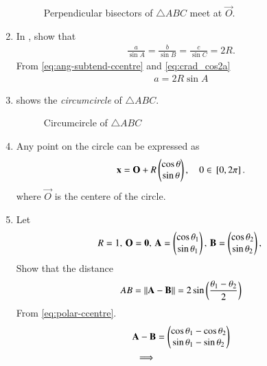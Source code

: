 \begin{enumerate}[label=\thesubsection.\arabic*.,ref=\thesubsection.\theenumi]
\begin{figure}[!ht]
\begin{center}
		\resizebox{0.6\columnwidth}{!}{}
	\end{center}
	\caption{ Perpendicular bisectors of $\triangle ABC$ meet at $\vec{O}$.}
	\label{fig:tri_ccentre}	
\end{figure}
\item In
	,
show that 
\begin{align}
\label{eq:tri_crad_R}
\frac{a}{\sin A} = \frac{b}{\sin B} = \frac{c}{\sin C} = 2R.
\end{align}
%
%
\solution
From 
\eqref{eq:ang-subtend-ccentre}
and 
\eqref{eq:crad_cos2a}
  \begin{align}
	  a = 2R \sin A
  \end{align}
  \item 
  shows the {\em circumcircle} of $\triangle ABC$.
\begin{figure}[!ht]
	\begin{center}
		\resizebox{0.6\columnwidth}{!}{}
	\end{center}
	\caption{Circumcircle of $\triangle ABC$}
	\label{fig:tri_ccircle-ang}	
\end{figure}
\item Any point on the circle can be expressed as 
  \begin{align}
	  \mathbf{x} = \mathbf{O} + R\begin{pmatrix}\cos \theta \\ \sin \theta\end{pmatrix}, \quad 0 \in {}\left[0, 2\pi\right]
\label{eq:polar-ccentre}.
  \end{align}
  where $\vec{O}$ is the centere of the circle.
  \item Let
  \begin{align}
	  R = 1,\,
	  \mathbf{O} = \mathbf{0} ,\,
	  \mathbf{A} = \begin{pmatrix}\cos \theta_1 \\ \sin \theta_1\end{pmatrix},\,
	  \mathbf{B} = \begin{pmatrix}\cos \theta_2 \\ \sin \theta_2\end{pmatrix},\,
  \end{align}
Show that the distance
  \begin{align}
	  AB = \left\lVert\mathbf{A}-\mathbf{B}\right\rVert = 
	   2 \sin \left(\frac{\theta_1-\theta_2}{2}\right)
\label{eq:norm-polar-ccentre}
  \end{align}
  \solution 
  From 
\eqref{eq:polar-ccentre}.
  \begin{align}
	  \vec{A}-\vec{B} &= 
\myvec{\cos \theta_1-\cos \theta_2 \\ \sin \theta_1-\sin \theta_2}
\\
\implies 

\end{align}
\end{enumerate}
